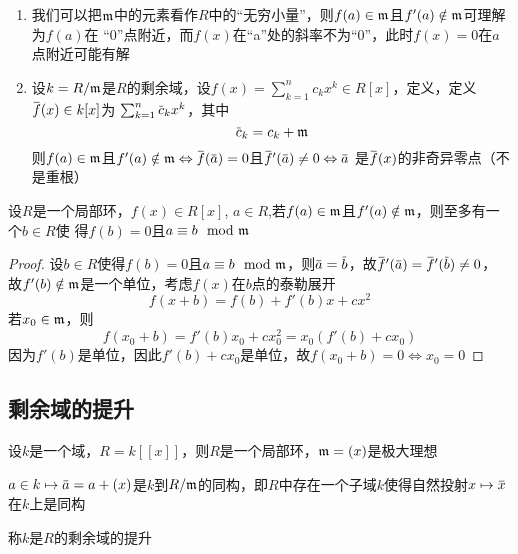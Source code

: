 \documentclass[11pt]{article}
\begin{document}
\begin{remark}
\begin{enumerate}
\item 我们可以把\(\mathfrak{m}\)中的元素看作\(R\)中的“无穷小量”，则\(f(a)\in\mathfrak{m}\)且\(f'(a)\notin\mathfrak{m}\)可理解为\(f(a)\)在
“0”点附近，而\(f(x)\)在“a”处的斜率不为“0”，此时\(f(x)=0\)在\(a\)点附近可能有解
\item 设\(k=R/\mathfrak{m}\)是\(R\)的剩余域，设\(f(x)=\sum_{k=1}^nc_kx^k\in R[x]\)，定义，定义\(\barf(x)\in k[x]\)为
\(\sum_{k=1}^n\barc_kx^k\)，其中
\begin{equation*}
\barc_k=c_k+\fm
\end{equation*}
则\(f(a)\in\mathfrak{m}\)且\(f'(a)\notin\fm \Leftrightarrow \barf(\bara)=0\)且\(\barf'(\bara)\neq 0 \Leftrightarrow \bara\)
是\(\barf(x)\)的非奇异零点（不是重根）
\end{enumerate}
\end{remark}

\begin{lemma}[]
设\(R\)是一个局部环，\(f(x)\in R[x]\), \(a\in R\),若\(f(a)\in\mathfrak{m}\)且\(f'(a)\notin\mathfrak{m}\)，则至多有一个\(b\in R\)使
得\(f(b)=0\)且\(a\equiv b\mod{\mathfrak{m}}\)
\end{lemma}

\begin{proof}
设\(b\in R\)使得\(f(b)=0\)且\(a\equiv b\mod{\mathfrak{m}}\)，则\(\bara=\barb\)，故\(\barf'(\bara)=\barf'(\barb)\neq 0\)，
故\(f'(b)\notin\mathfrak{m}\)是一个单位，考虑\(f(x)\)在\(b\)点的泰勒展开
\begin{equation*}
f(x+b)=f(b)+f'(b)x+cx^2
\end{equation*}
若\(x_0\in\mathfrak{m}\)，则
\begin{equation*}
f(x_0+b)=f'(b)x_0+cx_0^2=x_0(f'(b)+cx_0)
\end{equation*}
因为\(f'(b)\)是单位，因此\(f'(b)+cx_0\)是单位，故\(f(x_0+b)=0\Leftrightarrow x_0=0\)
\end{proof}
\subsection{剩余域的提升}
\label{sec:orga9fdf92}
\begin{examplle}[]
设\(k\)是一个域，\(R=k[[x]]\)，则\(R\)是一个局部环，\(\mathfrak{m}=(x)\)是极大理想

\(a\in k\mapsto\bara=a+(x)\)是\(k\)到\(R/\mathfrak{m}\)的同构，即\(R\)中存在一个子域\(k\)使得自然投射\(x\mapsto\barx\)
在\(k\)上是同构

称\(k\)是\(R\)的剩余域的提升
\end{examplle}
\end{document}
